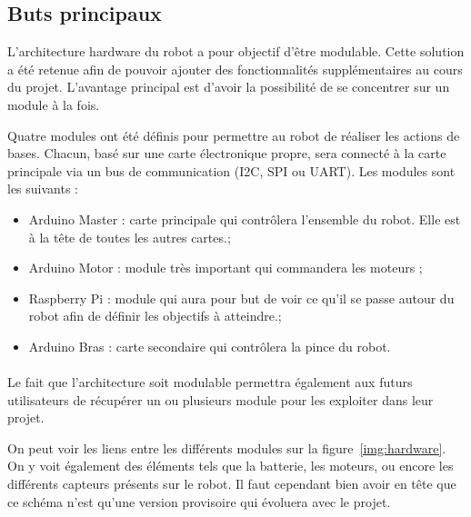 \subsection{Buts principaux}
L'architecture hardware du robot a pour objectif d'être modulable. Cette solution a été retenue afin de pouvoir ajouter des fonctionnalités supplémentaires au cours du projet. L'avantage principal est d'avoir la possibilité de se concentrer sur un module à la fois.

\noindent Quatre modules ont été définis pour permettre au robot de réaliser les actions de bases. Chacun, basé sur une carte électronique propre, sera connecté à la carte principale via un bus de communication (I2C, SPI ou UART). Les modules sont les suivants :

\begin{itemize}
	\item Arduino Master : carte principale qui contrôlera l'ensemble du robot. Elle est à la tête de toutes les autres cartes.;
	\item Arduino Motor : module très important qui commandera les moteurs ;
	\item Raspberry Pi : module qui aura  pour but de voir ce qu'il se passe autour du robot afin de définir les objectifs à atteindre.;
	\item Arduino Bras : carte secondaire qui contrôlera la pince du robot.
\end{itemize}

\paragraph{}
Le fait que l'architecture soit modulable permettra également aux futurs utilisateurs de récupérer un ou plusieurs module pour les exploiter dans leur projet.

\noindent On peut voir les liens entre les différents modules sur la figure~\ref{img:hardware}. On y voit également des éléments tels que la batterie, les moteurs, ou encore les différents capteurs présents sur le robot. Il faut cependant bien avoir en tête que ce schéma n'est qu'une version provisoire qui évoluera avec le projet.

